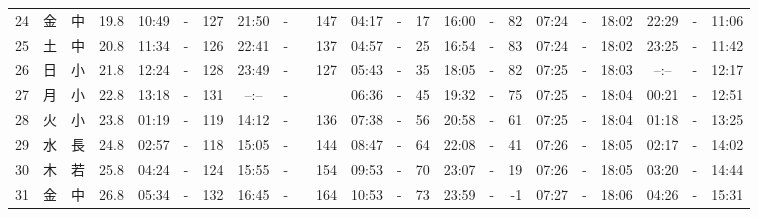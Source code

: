\documentclass[12pt,a4j]{jsarticle}
\begin{document}
\begin{table}[htbp]
\begin{center}
{\begin{tabular}{|rc|cr|ccrccr|ccrccr|ccc|ccc|}
24 & 金 & 中 & 19.8 &  10:49 &-& 127 &  21:50 &-& 147 &  04:17 &-&  17 &  16:00 &-&  82 & 07:24 & -& 18:02 & 22:29 & -& 11:06 \\
25 & 土 & 中 & 20.8 &  11:34 &-& 126 &  22:41 &-& 137 &  04:57 &-&  25 &  16:54 &-&  83 & 07:24 & -& 18:02 & 23:25 & -& 11:42 \\
26 & 日 & 小 & 21.8 &  12:24 &-& 128 &  23:49 &-& 127 &  05:43 &-&  35 &  18:05 &-&  82 & 07:25 & -& 18:03 & --:-- & -& 12:17 \\
27 & 月 & 小 & 22.8 &  13:18 &-& 131 &  --:-- &-&~~~~~ &  06:36 &-&  45 &  19:32 &-&  75 & 07:25 & -& 18:04 & 00:21 & -& 12:51 \\
28 & 火 & 小 & 23.8 &  01:19 &-& 119 &  14:12 &-& 136 &  07:38 &-&  56 &  20:58 &-&  61 & 07:25 & -& 18:04 & 01:18 & -& 13:25 \\
29 & 水 & 長 & 24.8 &  02:57 &-& 118 &  15:05 &-& 144 &  08:47 &-&  64 &  22:08 &-&  41 & 07:26 & -& 18:05 & 02:17 & -& 14:02 \\
30 & 木 & 若 & 25.8 &  04:24 &-& 124 &  15:55 &-& 154 &  09:53 &-&  70 &  23:07 &-&  19 & 07:26 & -& 18:05 & 03:20 & -& 14:44 \\
31 & 金 & 中 & 26.8 &  05:34 &-& 132 &  16:45 &-& 164 &  10:53 &-&  73 &  23:59 &-&  -1 & 07:27 & -& 18:06 & 04:26 & -& 15:31 \\
   \hline
   \end{tabular}}
   \end{center}
\end{table}
\newpage
\end{document}
